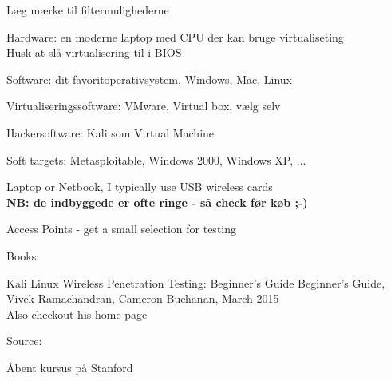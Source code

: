\documentclass[20pt,landscape,a4paper,footrule]{foils}
\begin{document}
\centerline{Læg mærke til filtermulighederne}



\begin{list2}
\item Hardware: en moderne laptop med CPU der kan bruge virtualiseting\\
Husk at slå virtualisering til i BIOS
\item Software: dit favoritoperativsystem, Windows, Mac, Linux
\item Virtualiseringssoftware: VMware, Virtual box, vælg selv
\item Hackersoftware: Kali som Virtual Machine 
\item Soft targets: Metasploitable, Windows 2000, Windows XP, ...
\end{list2}




\begin{list1}
\item Laptop or Netbook, I typically use USB wireless cards\\
{\bf NB: de indbyggede er ofte ringe - så check før køb ;-)}
\item Access Points - get a small selection for testing
\item Books:
\begin{list2}
\item
Kali Linux Wireless Penetration Testing: Beginner's Guide
Beginner's Guide, Vivek Ramachandran, Cameron Buchanan, March 2015\\
Also checkout his home page 
\end{list2}
\end{list1}




Source: 



Åbent kursus på Stanford\\

\myquestionspage
\end{document}
